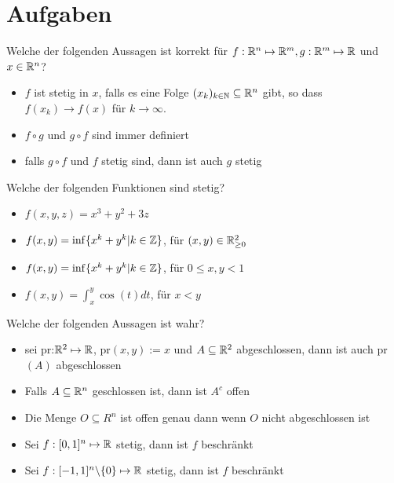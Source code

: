 \section{Aufgaben}



Welche der folgenden Aussagen ist korrekt für $f : \mathbb{R}^n \mapsto \mathbb{R}^m, g : \mathbb{R}^m
\mapsto \mathbb{R}$ und $x \in \mathbb{R}^n$?
\begin{itemize}
    \item[$\square$] $f$ ist stetig in $x$, falls es eine Folge $(x_k)_{k \in \mathbb{N}} \subseteq
    \mathbb{R}^n$ gibt, so dass $f(x_k) \to f(x)$ für $k \to \infty$.
    \item[$\square$] $f \circ g$ und $g \circ f$ sind immer definiert
    \item[$\square$] falls $g \circ f$ und $f$ stetig sind, dann ist auch $g$ stetig
\end{itemize}

\hrulefill

Welche der folgenden Funktionen sind stetig?
\begin{itemize}
    \item[\rlap{\raisebox{0.3ex}{\hspace{0.4ex}\tiny \ding{52}}}$\square$] $f(x,y,z) = x^3 + 
    y^2 + 3z$
    \item[$\square$] $f(x,y) = \inf \{x^k + y^k | k \in \mathbb{Z} \}$, für $(x,y) \in \mathbb{R}^2_{\geq 0}$
    \item[\rlap{\raisebox{0.3ex}{\hspace{0.4ex}\tiny \ding{52}}}$\square$] $f(x,y) = \inf 
    \{x^k + y^k | k \in \mathbb{Z} \}$, für $0 \leq x,y < 1$
    \item[\rlap{\raisebox{0.3ex}{\hspace{0.4ex}\tiny \ding{52}}}$\square$] $f(x,y) = \int_x^y
    \cos(t)dt$, für $x < y$
\end{itemize}

\hrulefill

Welche der folgenden Aussagen ist wahr?
\begin{itemize}
    \item[$\square$] sei pr:$\mathbb{R}^2 \mapsto \mathbb{R}$, pr$(x,y) := x$ und $A \subseteq \mathbb{R}^2$
    abgeschlossen, dann ist auch pr$(A)$ abgeschlossen
    \item[\rlap{\raisebox{0.3ex}{\hspace{0.4ex}\tiny \ding{52}}}$\square$] Falls $A \subseteq
    \mathbb{R}^n$ geschlossen ist, dann ist $A^c$ offen
    \item[$\square$] Die Menge $O \subseteq R^n$ ist offen genau dann wenn $O$ nicht 
    abgeschlossen ist
    \item[\rlap{\raisebox{0.3ex}{\hspace{0.4ex}\tiny \ding{52}}}$\square$] Sei $f:[0,1]^n 
    \mapsto \mathbb{R}$ stetig, dann ist $f$ beschränkt
    \item[$\square$] Sei $f:[-1,1]^n \backslash \{0\} \mapsto \mathbb{R}$ stetig, dann ist $f$
    beschränkt
\end{itemize}

